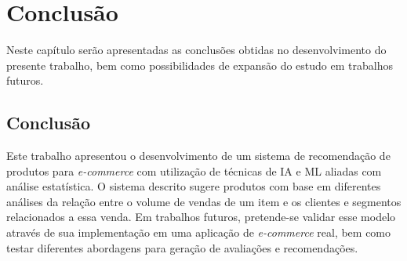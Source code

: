 \chapter{Conclusão}
\label{conclusão}

Neste capítulo serão apresentadas as conclusões obtidas no desenvolvimento do presente trabalho, bem como possibilidades de expansão do estudo em trabalhos futuros.

\section{Conclusão}
Este trabalho apresentou o desenvolvimento de um sistema de recomendação de produtos para \textit{e-commerce} com utilização de técnicas de IA e ML aliadas com análise estatística. O sistema descrito sugere produtos com base em diferentes análises da relação entre o volume de vendas de um item e os clientes e segmentos relacionados a essa venda. Em trabalhos futuros, pretende-se validar esse modelo através de sua implementação em uma aplicação de \textit{e-commerce} real, bem como testar diferentes abordagens para geração de avaliações e recomendações.

